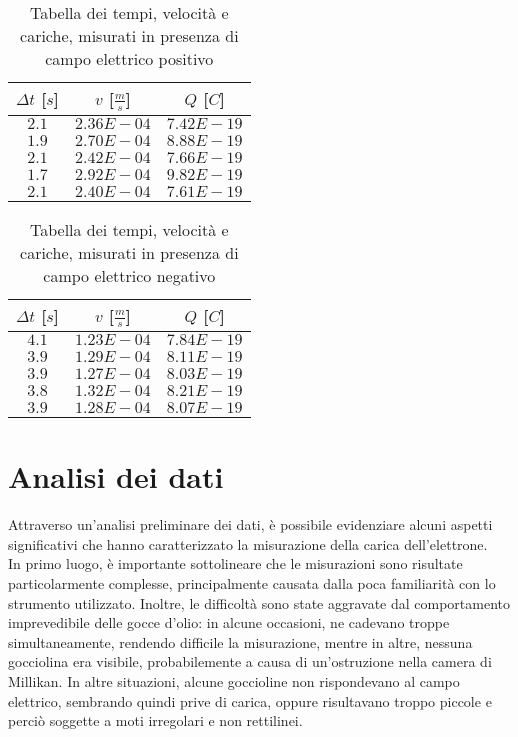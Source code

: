 \documentclass{article}
\begin{document}
\begin{multicols}{2}

\begin{table}[H]
	\centering
	\begin{tabular}{| c | c | c |}
		\hline
		$\Delta t$ [$s$] & $v$ [$\frac ms$] & $Q$ [$C$] \\
		\hline
		$2.1$ & $2.36E-04$ & $7.42E-19$ \\
		$1.9$ & $2.70E-04$ & $8.88E-19$ \\
		$2.1$ & $2.42E-04$ & $7.66E-19$ \\
		$1.7$ & $2.92E-04$ & $9.82E-19$ \\
		$2.1$ & $2.40E-04$ & $7.61E-19$ \\
		\hline
	\end{tabular}
	\caption{Tabella dei tempi, velocità e cariche, misurati in presenza di campo elettrico positivo}
	\label{}
\end{table}

\columnbreak

\begin{table}[H]
	\centering
	\begin{tabular}{| c | c | c |}
		\hline
		$\Delta t$ [$s$] & $v$ [$\frac ms$] & $Q$ [$C$] \\
		\hline
		$4.1$ & $1.23E-04$ & $7.84E-19$ \\
		$3.9$ & $1.29E-04$ & $8.11E-19$ \\
		$3.9$ & $1.27E-04$ & $8.03E-19$ \\
		$3.8$ & $1.32E-04$ & $8.21E-19$ \\
		$3.9$ & $1.28E-04$ & $8.07E-19$ \\
		\hline		
	\end{tabular}
	\caption{Tabella dei tempi, velocità e cariche, misurati in presenza di campo elettrico negativo}
	\label{}
\end{table}
	
\end{multicols}

\section{Analisi dei dati}
Attraverso un'analisi preliminare dei dati, è possibile evidenziare alcuni aspetti significativi che hanno caratterizzato la misurazione della carica dell'elettrone.\\

In primo luogo, è importante sottolineare che le misurazioni sono risultate particolarmente complesse, principalmente causata dalla poca familiarità con lo strumento utilizzato. Inoltre, le difficoltà sono state aggravate dal comportamento imprevedibile delle gocce d'olio: in alcune occasioni, ne cadevano troppe simultaneamente, rendendo difficile la misurazione, mentre in altre, nessuna gocciolina era visibile, probabilemente a causa di un'ostruzione nella camera di Millikan. In altre situazioni, alcune goccioline non rispondevano al campo elettrico, sembrando quindi prive di carica, oppure risultavano troppo piccole e perciò soggette a moti irregolari e non rettilinei.\\
\end{document}
